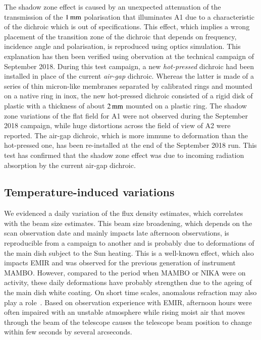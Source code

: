 The shadow zone effect is caused by an unexpected attenuation of
the transmission of the $1\,\rm{mm}$ polarisation that illuminates
A1 due to a characteristic of the dichroic which is out of
specifications.
This effect,
which implies a wrong placement of the transition zone of the dichroic
that depends on frequency, incidence angle and polarisation, is 
reproduced using optics simulation. This explanation has then been
verified using obervation at the technical campaign of September
2018. During this test campaign, a new \emph{hot-pressed} dichroic had
been installed in place of the current \emph{air-gap} dichroic.
Whereas the latter is made of a series of thin
micron-like membranes separated by calibrated rings and mounted on
a native ring in inox, the new hot-pressed dichroic consisted of a
rigid disk of plastic with a thickness of about $2\,\rm{mm}$ mounted on a
plastic ring. The shadow zone variations of the flat field for A1 were
not observed during the September 2018 campaign, while huge distortions
across the field of view of A2 were reported. The air-gap dichroic,
which is more immune to deformation than the hot-pressed one, has been
re-installed at the end of the September 2018 run. This test has
confirmed that the shadow zone effect was due to incoming radiation
absorption by the current air-gap dichroic.



\subsection{Temperature-induced variations}
\label{se:beam_variation}
We evidenced a daily variation of the flux density estimates,
which correlates with the beam size estimates.
This beam size broadening, which depends on the
scan observation date and mainly impacts late
afternoon observations, is reproducible from a campaign to another and 
is probably due to deformations of the main dish subject to the Sun
heating. This is a well-known effect, which also impacts EMIR and was
observed for the previous generation of instrument MAMBO. However,
compared to the period when MAMBO or NIKA were on activity, these
daily deformations have probably strengthen due to the ageing of the
main dish white coating. On short time scales, anomalous refraction
may also play a role~\cite{Altenhoff1987}. Based on observation
experience with EMIR, afternoon hours were often impaired with an
unstable atmosphere while rising moist air that
moves through the beam of the telescope causes the telescope beam
position to change within few seconds by several arcseconds.


